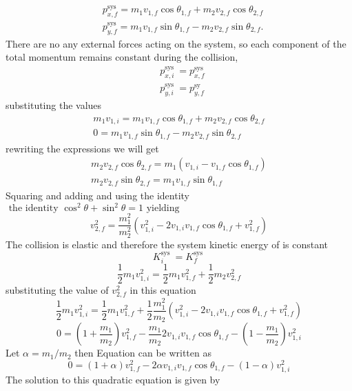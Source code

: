 $$
\begin{aligned}
&p_{x, f}^{\mathrm{sys}}=m_{1} v_{1, f} \cos \theta_{1, f}+m_{2} v_{2, f} \cos \theta_{2, f} \\
&p_{y, f}^{\mathrm{sys}}=m_{1} v_{1, f} \sin \theta_{1, f}-m_{2} v_{2, f} \sin \theta_{2, f} .
\end{aligned}
$$
There are no any external forces acting on the system, so each component of the total momentum remains constant during the collision,
$$
\begin{aligned}
&p_{x, i}^{\text {sys }}=p_{x, f}^{\text {sys }} \\
&p_{y, i}^{\text {sys }}=p_{y, f}^{\text {sy }}
\end{aligned}
$$
substituting the values\\
$$\begin{gathered}
m_{1} v_{1, i}=m_{1} v_{1, f} \cos \theta_{1, f}+m_{2} v_{2, f} \cos \theta_{2, f} \\
0=m_{1} v_{1, f} \sin \theta_{1, f}-m_{2} v_{2, f} \sin \theta_{2, f}
\end{gathered}$$
rewriting the expressions we will get \\
\begin{align}
m_{2} v_{2, f} \cos \theta_{2, f}=m_{1}\left(v_{1, i}-v_{1, f} \cos \theta_{1, f}\right)\\
m_{2} v_{2, f} \sin \theta_{2, f}=m_{1} v_{1, f} \sin \theta_{1, f}
\end{align}
Squaring and adding and using the identity $\text { the identity } \cos ^{2} \theta+\sin ^{2} \theta=1 \text { yielding }$
$$v_{2, f}^{2}=\frac{m_{1}^{2}}{m_{2}^{2}}\left(v_{1, i}^{2}-2 v_{1, i} v_{1, f} \cos \theta_{1, f}+v_{1, f}^{2}\right)$$
The collision is elastic and therefore the system kinetic energy of is constant
$$
K_{i}^{\text {sys }}=K_{f}^{\text {sys }}
$$
$$
\frac{1}{2} m_{1} v_{1, i}^{2}=\frac{1}{2} m_{1} v_{1, f}^{2}+\frac{1}{2} m_{2} v_{2, f}^{2}
$$
substituting the value of $v_{2, f}^{2}$ in this equation\\
$$\frac{1}{2} m_{1} v_{1, i}^{2}=\frac{1}{2} m_{1} v_{1, f}^{2}+\frac{1}{2} \frac{m_{1}^{2}}{m_{2}}\left(v_{1, i}^{2}-2 v_{1, i} v_{1, f} \cos \theta_{1, f}+v_{1, f}^{2}\right)$$
$$0=\left(1+\frac{m_{1}}{m_{2}}\right) v_{1, f}^{2}-\frac{m_{1}}{m_{2}} 2 v_{1, i} v_{1, f} \cos \theta_{1, f}-\left(1-\frac{m_{1}}{m_{2}}\right) v_{1, i}^{2}$$
Let $\alpha=m_{1} / m_{2}$ then Equation can be written as
$$
0=(1+\alpha) v_{1, f}^{2}-2 \alpha v_{1, i} v_{1, f} \cos \theta_{1, f}-(1-\alpha) v_{1, i}^{2}
$$
The solution to this quadratic equation is given by
